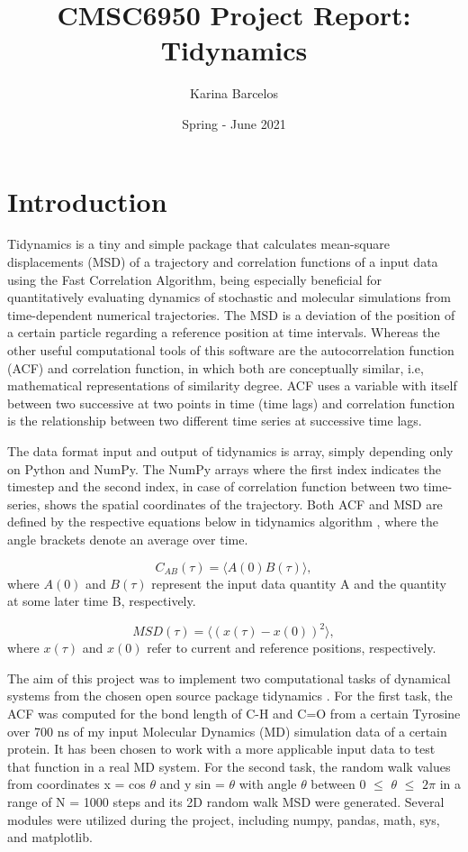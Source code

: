 \documentclass{article}
\title{CMSC6950 Project Report: Tidynamics}
\author{Karina Barcelos}
\date{Spring - June 2021}
\begin{document}
\maketitle

\section{Introduction}

Tidynamics \cite{Buyl2018} is a tiny and simple package that calculates mean-square displacements (MSD) of a trajectory and correlation functions of a input data using the Fast Correlation Algorithm, being \cite{kneller1995nmoldyn} especially beneficial for quantitatively evaluating dynamics of stochastic and molecular simulations from time-dependent numerical trajectories. The MSD is a deviation of the position of a certain particle regarding a reference position at time intervals. Whereas the other useful computational tools of this software are the autocorrelation function (ACF) and correlation function, in which both are conceptually similar, i.e, mathematical representations of similarity degree. ACF uses a variable with itself between two successive at two points in time (time lags) and correlation function is the relationship between two different time series at successive time lags.
 
The data format input and output of tidynamics \cite{Buyl2018} is array, simply depending only on Python and NumPy. The NumPy arrays where the first index indicates the timestep and the second index, in case of correlation function between two time-series, shows the spatial coordinates of the trajectory. Both ACF and MSD are defined by the respective equations below in tidynamics algorithm \cite{Buyl2018}, where the angle brackets denote an average over time. \cite{kneller1995nmoldyn}

\begin{equation}
C_{AB}(\tau) = \langle A(0) B(\tau) \rangle,
\label{eqn:correlation}
\end{equation}
where  $A(0)$ and $B(\tau)$ represent the input data quantity A and the quantity at some later time B, respectively.

\begin{equation}
MSD(\tau) = \langle (x(\tau) - x(0) )^2 \rangle,
\label{eqn:msd}
\end{equation}
where $x(\tau)$ and $x(0)$ refer to current and reference positions, respectively.

The aim of this project was to implement two computational tasks of dynamical systems from the chosen open source package tidynamics \cite{Buyl2018}. For the first task, the ACF was computed for the bond length of C-H and C=O from a certain Tyrosine over 700 ns of my input Molecular Dynamics (MD) simulation data of a certain protein. It has been chosen to work with a more applicable input data to test that function in a real MD system. For the second task, the random walk values from coordinates x = cos $\theta$ and y sin = $\theta$ with angle $\theta$ between 0 $\leq$ $\theta$ $\leq$ $2\pi$ in a range of N = 1000 steps and its 2D random walk MSD were generated. Several modules were utilized during the project, including numpy, pandas, math, sys, and matplotlib.
\end{document}
